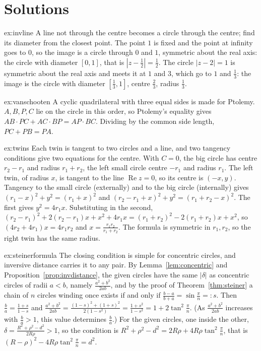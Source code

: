 \section{Solutions}

\begin{solution}{ex:invline}
\idea A line not through the centre becomes a circle through the centre; find its diameter from the closest point.
\writeup The point $1$ is fixed and the point at infinity goes to $0$, so the image is a circle through $0$ and $1$, symmetric about the real axis:
the circle with diameter $[0,1]$, that is $|z-\frac12|=\frac12$. The circle $|z-2|=1$ is symmetric about the real axis and meets it at $1$ and $3$,
which go to $1$ and $\frac13$: the image is the circle with diameter $[\frac13,1]$, centre $\frac23$, radius $\frac13$.
\end{solution}

\begin{solution}{ex:vanschooten}
\idea A cyclic quadrilateral with three equal sides is made for Ptolemy.
\writeup $A,B,P,C$ lie on the circle in this order, so Ptolemy's equality gives $AB\cdot PC+AC\cdot BP=AP\cdot BC$. Dividing by the common side
length, $PC+PB=PA$.
\end{solution}

\begin{solution}{ex:twins}
\idea Each twin is tangent to two circles and a line, and two tangency conditions give two equations for the centre.
\writeup With $C=0$, the big circle has centre $r_2-r_1$ and radius $r_1+r_2$, the left small circle centre $-r_1$ and radius $r_1$. The left twin,
of radius $x$, is tangent to the line $\operatorname{Re}z=0$, so its centre is $(-x,y)$. Tangency to the small circle (externally) and to the big
circle (internally) gives $(r_1-x)^2+y^2=(r_1+x)^2$ and $(r_2-r_1+x)^2+y^2=(r_1+r_2-x)^2$. The first gives $y^2=4r_1x$. Substituting in the second,
$(r_2-r_1)^2+2(r_2-r_1)x+x^2+4r_1x=(r_1+r_2)^2-2(r_1+r_2)x+x^2$, so $(4r_2+4r_1)x=4r_1r_2$ and $x=\frac{r_1r_2}{r_1+r_2}$. The formula is symmetric
in $r_1,r_2$, so the right twin has the same radius.
\end{solution}

\begin{solution}{ex:steinerformula}
\idea The closing condition is simple for concentric circles, and inversive distance carries it to any pair.
\writeup By Lemma~\ref{lem:concentric} and Proposition~\ref{prop:invdistance}, the given circles have the same $|\delta|$ as concentric circles of radii
$a<b$, namely $\frac{a^2+b^2}{2ab}$, and by the proof of Theorem~\ref{thm:steiner} a chain of $n$ circles winding once exists if and only if
$\frac{b-a}{b+a}=\sin\frac\pi n=:s$. Then $\frac ba=\frac{1+s}{1-s}$ and $\frac{a^2+b^2}{2ab}=\frac{(1-s)^2+(1+s)^2}{2(1-s^2)}=\frac{1+s^2}{1-s^2}=1+2\tan^2\frac\pi n$.
(As $\frac{a^2+b^2}{2ab}$ increases with $\frac ba>1$, this value determines $\frac ba$.) For the given circles, one inside the other, $\delta=
\frac{R^2+\rho^2-d^2}{2R\rho}>1$, so the condition is $R^2+\rho^2-d^2=2R\rho+4R\rho\tan^2\frac\pi n$, that is $(R-\rho)^2-4R\rho\tan^2\frac\pi n=d^2$.
\end{solution}

